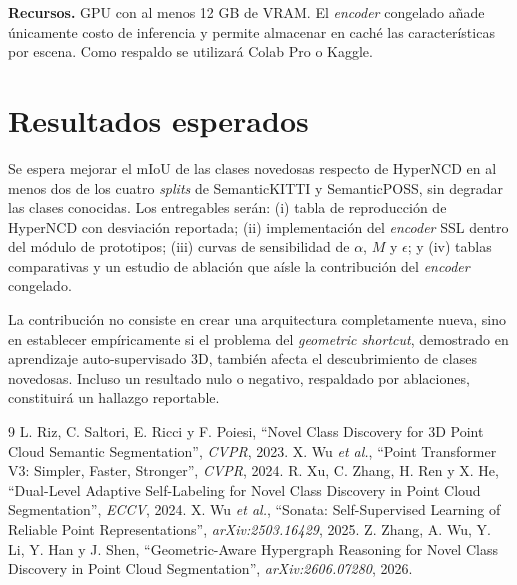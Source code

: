 \documentclass[9pt,twocolumn,a4paper]{extarticle}
\begin{document}
\textbf{Recursos.}
GPU con al menos 12 GB de VRAM. El \emph{encoder} congelado añade únicamente
costo de inferencia y permite almacenar en caché las características por
escena. Como respaldo se utilizará Colab Pro o Kaggle.

\section{Resultados esperados}
Se espera mejorar el mIoU de las clases novedosas respecto de HyperNCD en al
menos dos de los cuatro \emph{splits} de SemanticKITTI y SemanticPOSS, sin
degradar las clases conocidas. Los entregables serán: (i) tabla de
reproducción de HyperNCD con desviación reportada; (ii) implementación del
\emph{encoder} SSL dentro del módulo de prototipos; (iii) curvas de
sensibilidad de $\alpha$, $M$ y $\epsilon$; y (iv) tablas comparativas y un
estudio de ablación que aísle la contribución del \emph{encoder} congelado.

La contribución no consiste en crear una arquitectura completamente nueva,
sino en establecer empíricamente si el problema del \emph{geometric
shortcut}, demostrado en aprendizaje auto-supervisado 3D, también afecta el
descubrimiento de clases novedosas. Incluso un resultado nulo o negativo,
respaldado por ablaciones, constituirá un hallazgo reportable.

{\small
\begin{thebibliography}{9}
L. Riz, C. Saltori, E. Ricci y F. Poiesi,
``Novel Class Discovery for 3D Point Cloud Semantic Segmentation'',
\emph{CVPR}, 2023.
X. Wu \emph{et al.},
``Point Transformer V3: Simpler, Faster, Stronger'',
\emph{CVPR}, 2024.
R. Xu, C. Zhang, H. Ren y X. He,
``Dual-Level Adaptive Self-Labeling for Novel Class Discovery in Point Cloud
Segmentation'',
\emph{ECCV}, 2024.
X. Wu \emph{et al.},
``Sonata: Self-Supervised Learning of Reliable Point Representations'',
\emph{arXiv:2503.16429}, 2025.
Z. Zhang, A. Wu, Y. Li, Y. Han y J. Shen,
``Geometric-Aware Hypergraph Reasoning for Novel Class Discovery in Point
Cloud Segmentation'',
\emph{arXiv:2606.07280}, 2026.
\end{thebibliography}
}
\end{document}
